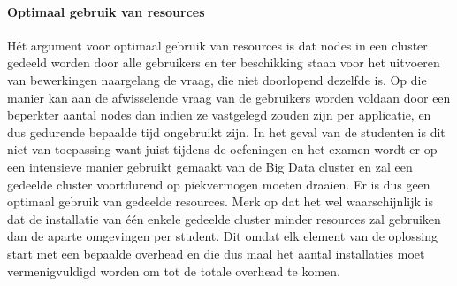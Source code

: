 \paragraph{Optimaal gebruik van resources}
Hét argument voor optimaal gebruik van resources is dat nodes in een cluster gedeeld worden door alle gebruikers en ter beschikking staan voor het uitvoeren van bewerkingen naargelang de vraag, die niet doorlopend dezelfde is. Op die manier kan aan de afwisselende vraag van de gebruikers worden voldaan door een beperkter aantal nodes dan indien ze vastgelegd zouden zijn per applicatie, en dus gedurende bepaalde tijd ongebruikt zijn.
\newline
In het geval van de studenten is dit niet van toepassing want juist tijdens de oefeningen en het examen wordt er op een intensieve manier gebruikt gemaakt van de Big Data cluster en zal een gedeelde cluster voortdurend op piekvermogen moeten draaien. Er is dus geen optimaal gebruik van gedeelde resources.
\newline
Merk op dat het wel waarschijnlijk is dat de installatie van één enkele gedeelde cluster minder resources zal gebruiken dan de aparte omgevingen per student. Dit omdat elk element van de oplossing start met een bepaalde overhead en die dus maal het aantal installaties moet vermenigvuldigd worden om tot de totale overhead te komen.

